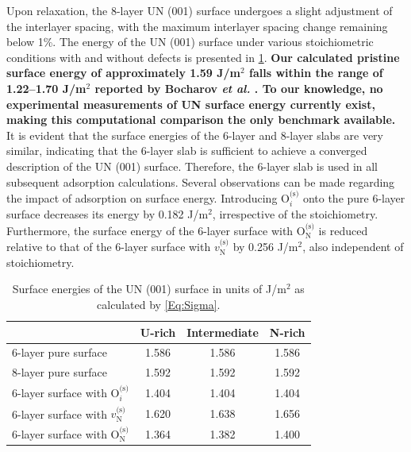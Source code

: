 \documentclass[preprint,12pt,sort&compress]{elsarticle}
\newcommand{\?}{\stackrel{?}{=}}
\providecommand{\DIFaddtex}[1]{{\bf #1}} %
\providecommand{\DIFaddbegin}{\protect\color{blue}} %
\providecommand{\DIFaddend}{\protect\color{black}} %
\providecommand{\DIFadd}[1]{\texorpdfstring{\DIFaddtex{#1}}{#1}} %
\newcommand{\DIFaddincludegraphics}[2][]{{\color{blue}\fbox{\DIFOincludegraphics[#1]{#2}}}} %
\DeclareRobustCommand{\DIFaddbegin}{\DIFOaddbegin \let\includegraphics\DIFaddincludegraphics} %
\DeclareRobustCommand{\DIFaddend}{\DIFOaddend \let\includegraphics\DIFOincludegraphics} %
\begin{document}
Upon relaxation, the 8-layer UN (001) surface undergoes a slight adjustment of the interlayer spacing, with the maximum interlayer spacing change remaining below 1\%. The energy of the UN (001) surface under various stoichiometric conditions with and without defects is presented in \cref{Tab:SurfE}. \DIFaddbegin \DIFadd{Our calculated pristine surface energy of approximately 1.59 J/m$^2$ falls within the range of 1.22--1.70 J/m$^2$ reported by Bocharov \textit{et al.} \cite{Bocharov2011SS}. To our knowledge, no experimental measurements of UN surface energy currently exist, making this computational comparison the only benchmark available. }\DIFaddend It is evident that the surface energies of the 6-layer and 8-layer slabs are very similar, indicating that the 6-layer slab is sufficient to achieve a converged description of the UN (001) surface. Therefore, the 6-layer slab is used in all subsequent adsorption calculations. Several observations can be made regarding the impact of adsorption on surface energy. Introducing $\text{O}_i^{\text{(s)}}$ onto the pure 6-layer surface decreases its energy by 0.182 J/m$^2$, irrespective of the stoichiometry. Furthermore, the surface energy of the 6-layer surface with $\text{O}_\text{N}^{\text{(s)}}$ is reduced relative to that of the 6-layer surface with $v_\text{N}^{\text{(s)}}$ by 0.256 J/m$^2$, also independent of stoichiometry.

\begin{table}[h!]
\centering
\caption{Surface energies of the UN (001) surface in units of J/m$^2$ as calculated by \cref{Eq:Sigma}.}
\footnotesize
\begin{tabular}{lccc}
\hline
 & U-rich & Intermediate & N-rich \\
\hline
6-layer pure surface & 1.586 & 1.586 & 1.586 \\
8-layer pure surface  & 1.592 & 1.592 & 1.592 \\
6-layer surface with O$_i^\text{(s)}$ & 1.404 & 1.404 & 1.404 \\
6-layer surface with $v_\text{N}^\text{(s)}$ & 1.620 & 1.638 & 1.656 \\
6-layer surface with O$_\text{N}^\text{(s)}$ & 1.364 & 1.382 & 1.400 \\
\hline
\end{tabular}
\label{Tab:SurfE}
\end{table}
\end{document}
